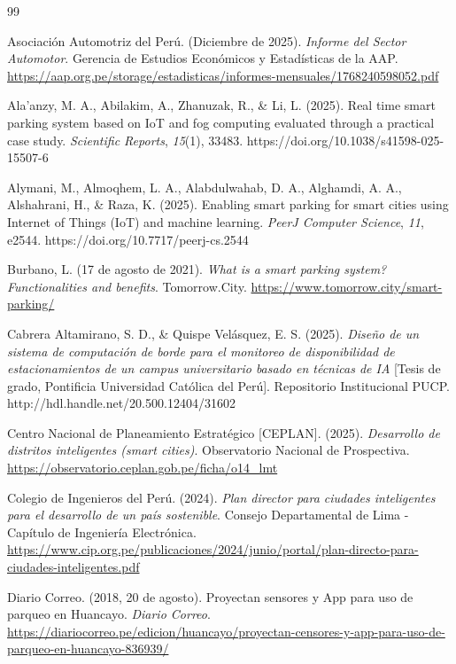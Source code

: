 \documentclass[12pt,a4paper]{article}
\begin{document}
\begin{thebibliography}{99}
	
	Asociación Automotriz del Perú. (Diciembre de 2025).
	\textit{Informe del Sector Automotor}.
	Gerencia de Estudios Económicos y Estadísticas de la AAP.
	\url{https://aap.org.pe/storage/estadisticas/informes-mensuales/1768240598052.pdf}
	
	Ala'anzy, M. A., Abilakim, A., Zhanuzak, R., \& Li, L. (2025).
	Real time smart parking system based on IoT and fog computing evaluated through a practical case study.
	\textit{Scientific Reports}, \textit{15}(1), 33483.
	https://doi.org/10.1038/s41598-025-15507-6
	
	Alymani, M., Almoqhem, L. A., Alabdulwahab, D. A., Alghamdi, A. A., Alshahrani, H., \& Raza, K. (2025).
	Enabling smart parking for smart cities using Internet of Things (IoT) and machine learning.
	\textit{PeerJ Computer Science}, \textit{11}, e2544.
	https://doi.org/10.7717/peerj-cs.2544
	
	Burbano, L. (17 de agosto de 2021).
	\textit{What is a smart parking system? Functionalities and benefits}.
	Tomorrow.City.
	\url{https://www.tomorrow.city/smart-parking/}
	
	Cabrera Altamirano, S. D., \& Quispe Velásquez, E. S. (2025).
	\textit{Diseño de un sistema de computación de borde para el monitoreo de disponibilidad de estacionamientos de un campus universitario basado en técnicas de IA}
	[Tesis de grado, Pontificia Universidad Católica del Perú].
	Repositorio Institucional PUCP.
	http://hdl.handle.net/20.500.12404/31602
	
	Centro Nacional de Planeamiento Estratégico [CEPLAN]. (2025).
	\textit{Desarrollo de distritos inteligentes (smart cities)}.
	Observatorio Nacional de Prospectiva.
	\url{https://observatorio.ceplan.gob.pe/ficha/o14_lmt}
	
	Colegio de Ingenieros del Perú. (2024).
	\textit{Plan director para ciudades inteligentes para el desarrollo de un país sostenible}.
	Consejo Departamental de Lima - Capítulo de Ingeniería Electrónica.
	\url{https://www.cip.org.pe/publicaciones/2024/junio/portal/plan-directo-para-ciudades-inteligentes.pdf}
	
	Diario Correo. (2018, 20 de agosto).
	Proyectan sensores y App para uso de parqueo en Huancayo.
	\textit{Diario Correo}.
	\url{https://diariocorreo.pe/edicion/huancayo/proyectan-censores-y-app-para-uso-de-parqueo-en-huancayo-836939/}
	

\end{thebibliography}
\end{document}
